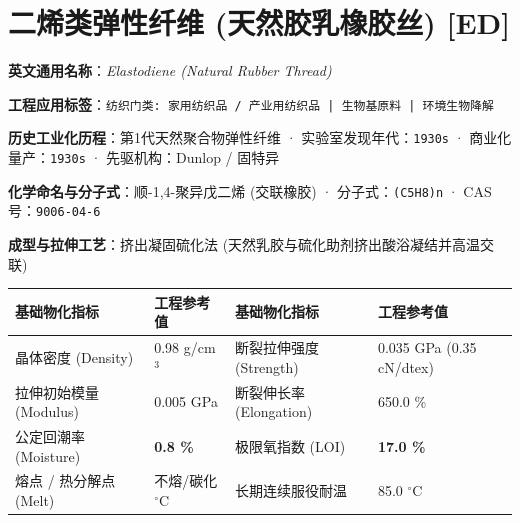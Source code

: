 \documentclass[11pt,openright,twoside,UTF8]{ctexbook}
\begin{document}
\section{二烯类弹性纤维 (天然胶乳橡胶丝) [ED]}
\label{sec:ed}

\noindent\textbf{英文通用名称}：\textit{Elastodiene (Natural Rubber Thread)}\par
\noindent\textbf{工程应用标签}：\texttt{纺织门类: 家用纺织品 / 产业用纺织品 | 生物基原料 | 环境生物降解}\par
\noindent\textbf{历史工业化历程}：第1代天然聚合物弹性纤维 · 实验室发现年代：\texttt{1930s} · 商业化量产：\texttt{1930s} · 先驱机构：Dunlop / 固特异\par
\noindent\textbf{化学命名与分子式}：顺-1,4-聚异戊二烯 (交联橡胶) · 分子式：\texttt{(C5H8)n} · CAS 号：\texttt{9006-04-6}\par
\noindent\textbf{成型与拉伸工艺}：挤出凝固硫化法 (天然乳胶与硫化助剂挤出酸浴凝结并高温交联)\par

\vspace{0.15cm}
\begin{center}
\small
\begin{tabularx}{\textwidth}{p{3.8cm}Xp{3.8cm}X}
\toprule
\textbf{基础物化指标} & \textbf{工程参考值} & \textbf{基础物化指标} & \textbf{工程参考值} \\
\midrule
晶体密度 (Density) & 0.98 g/cm$^3$ & 断裂拉伸强度 (Strength) & 0.035 GPa (0.35 cN/dtex) \\
拉伸初始模量 (Modulus) & 0.005 GPa & 断裂伸长率 (Elongation) & 650.0 \% \\
公定回潮率 (Moisture) & \textbf{0.8 \%} & 极限氧指数 (LOI) & \textbf{17.0 \%} \\
熔点 / 热分解点 (Melt) & 不熔/碳化 $^\circ\mathrm{C}$ & 长期连续服役耐温 & 85.0 $^\circ\mathrm{C}$ \\
\bottomrule
\end{tabularx}
\end{center}
\vspace{0.15cm}
\end{document}

